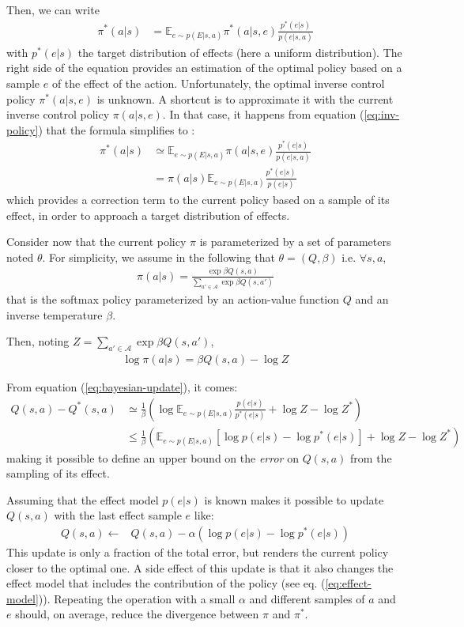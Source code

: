\documentclass[runningheads]{llncs}
\begin{document}
Then, we can write 
\begin{align}
\pi^*(a|s) &= \mathbb{E}_{e\sim p(E|s,a)} \pi^*(a|s,e)\frac{p^*(e|s)}{p(e|s,a)}
\end{align}
with $p^*(e|s)$ the target distribution of effects (here a uniform distribution).
The right side of the equation provides an estimation of the optimal policy based on a sample $e$ of the effect of the action. Unfortunately, the optimal inverse control policy $\pi^*(a|s,e)$ is unknown. A shortcut is to approximate it with the current inverse control policy $\pi(a|s,e)$.
In that case, it happens from equation (\ref{eq:inv-policy}) that the formula simplifies to :
\begin{align}\label{eq:bayesian-update}
\pi^*(a|s) &\simeq \mathbb{E}_{e\sim p(E|s,a)} \pi(a|s,e)\frac{p^*(e|s)}{p(e|s,a)}\\
&= \pi(a|s) \mathbb{E}_{e\sim p(E|s,a)} \frac{p^*(e|s)}{p(e|s)}
\end{align}
which provides a correction term to the current policy based on a sample of its effect, in order to approach a target distribution of effects.

Consider now that the current policy $\pi$ is parameterized by a set of parameters noted $\theta$. For simplicity, we assume in the following that $\theta=(Q,\beta)$ i.e. $\forall s,a$,
\begin{align}
\pi(a|s) = \frac{\exp \beta Q(s,a)}{\sum_{a'\in \mathcal{A}} \exp \beta Q(s,a')}
\end{align}
that is the softmax policy parameterized by an action-value function $Q$ and an inverse temperature $\beta$.

Then, noting $Z= \sum_{a'\in \mathcal{A}} \exp \beta Q(s,a')$, 
\begin{align}
\log \pi(a|s) = \beta Q(s,a) - \log Z
\end{align}

From equation (\ref{eq:bayesian-update}), it comes:
\begin{align}
 Q(s,a) - Q^*(s,a) &\simeq \frac{1}{\beta} \left(\log \mathbb{E}_{e\sim p(E|s,a)} \frac{p(e|s)}{p^*(e|s)} + \log Z - \log Z^*\right)\\
 &\leq \frac{1}{\beta}  \left(\mathbb{E}_{e\sim p(E|s,a)} [\log p(e|s) - \log p^*(e|s)] + \log Z - \log Z^*\right) \label{eq:TD-err}
\end{align}
making it possible to define an upper bound on the \emph{error} on $Q(s,a)$ from the sampling of its effect.

Assuming that the effect model $p(e|s)$ is known makes it possible to update $Q(s,a)$ with the last effect sample $e$ like:
\begin{align}\label{eq:Q-update}
Q(s,a) \leftarrow & Q(s,a) - \alpha (\log p(e|s) - \log p^*(e|s))
\end{align}  
This update is only a fraction of the total error, but renders the current policy closer to the optimal one. A side effect of this update is that it also changes the effect model that includes the contribution of the policy (see eq. (\ref{eq:effect-model})). Repeating the operation with a small $\alpha$ and different samples of $a$ and $e$ should, on average, reduce the divergence between $\pi$ and $\pi^*$.
\end{document}
